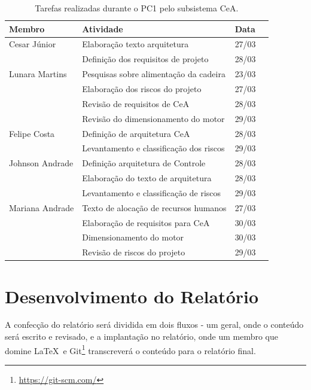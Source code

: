 \begin{table}[h]
  \begin{center}
  \caption{\label{tarefas}Tarefas realizadas durante o PC1 pelo subsistema CeA.}
  \begin{tabular}{|l|l|l|l|}
  \hline
  \textbf{Membro} & \textbf{Atividade} & \textbf{Data} \\ \hline\hline
  Cesar Júnior & Elaboração texto arquitetura  & 27/03 \\ \hline
   & Definição dos requisitos de projeto & 28/03 \\ \hline
  Lunara Martins & Pesquisas sobre alimentação da cadeira & 23/03 \\ \hline
   & Elaboração dos riscos do projeto & 27/03 \\ \hline
   & Revisão de requisitos de CeA & 28/03 \\ \hline
   & Revisão do dimensionamento do motor & 29/03 \\ \hline
  Felipe Costa & Definição de arquitetura CeA & 28/03 \\ \hline
   & Levantamento e classificação dos riscos & 29/03 \\ \hline
  Johnson Andrade & Definição arquitetura de Controle & 28/03 \\ \hline
   & Elaboração do texto de arquitetura  & 28/03 \\ \hline
   & Levantamento e classificação de riscos  & 29/03 \\ \hline
  Mariana Andrade & Texto de alocação de recursos humanos & 27/03 \\ \hline
   & Elaboração de requisitos para CeA & 30/03 \\ \hline
   & Dimensionamento do motor & 30/03 \\ \hline
   & Revisão de riscos do projeto & 29/03 \\ \hline
  \end{tabular}
  \end{center}
\end{table}

\section{Desenvolvimento do Relatório}

A confecção do relatório será dividida em dois fluxos - um geral, onde o
conteúdo será escrito e revisado, e a implantação no relatório, onde um
membro que domine \LaTeX\ e
Git\footnote{\url{https://git-scm.com/}} transcreverá o conteúdo para o
relatório final.

